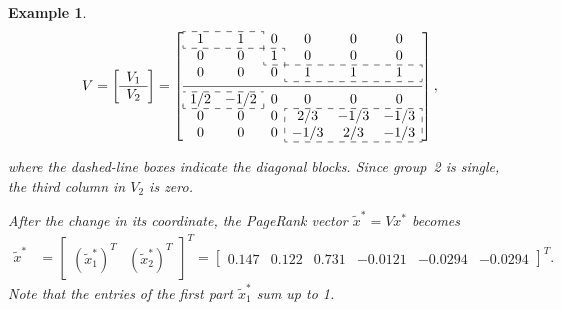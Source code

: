 \documentclass[11pt,draftcls,onecolumn]{IEEEtran}
\newtheorem{example}[theorem]{Example}
\begin{document}
\begin{example}
\vspace*{-2mm}
{\small
\[
 V = \left[
       \begin{array}{c}
         V_1\\       
         \hline
         V_2
       \end{array}
     \right]
   = \left[
     \begin{array}{ccccccc}
       \cdashline{1-2}
       \multicolumn{1}{:c}{1} & \multicolumn{1}{c:}{1} & 0 & 0 & 0 & 0\\
       \cdashline{1-3}
       0 & 0 & \multicolumn{1}{:c:}{1} & 0 & 0 & 0\\
       \cdashline{3-6}
       0 & 0 & 0 & \multicolumn{1}{:c}{1} & 1 & \multicolumn{1}{c:}{1}\\
       \cdashline{4-6}\\[-3mm]
       \hline\\[-3mm]
       \cdashline{1-2}
       \multicolumn{1}{:c}{1/2} & \multicolumn{1}{c:}{-1/2} & 0   & 0 & 0 & 0\\
       \cdashline{1-2}\cdashline{4-6}
       0 & 0 & 0 &  \multicolumn{1}{:c}{2/3} & -1/3 & \multicolumn{1}{c:}{-1/3}\\
       0 & 0 & 0 & \multicolumn{1}{:c}{-1/3} &  2/3 & \multicolumn{1}{c:}{-1/3}\\
       \cdashline{4-6}
    \end{array}\right],
\]}

\vspace*{-2mm}
\noindent
where the dashed-line boxes indicate the diagonal blocks.
Since group~2 is single, the third column in $V_2$ is zero. 

After the change in its coordinate,
the PageRank vector $\widetilde{x}^*=V x^*$ becomes
\begin{align*}
 \widetilde{x}^* 
  &= \left[
       \begin{array}{c|c}
         (\widetilde{x}_1^*)^T & (\widetilde{x}_2^*)^T  
       \end{array}
    \right]^T
  = \left[
       \begin{array}{ccc|ccc}
         0.147 & 0.122 & 0.731 & -0.0121 &  -0.0294 & -0.0294
       \end{array}
    \right]^T.    
\end{align*}
Note that the entries of the first part $\widetilde{x}_1^*$ sum up to 1.


\end{example}
\end{document}
